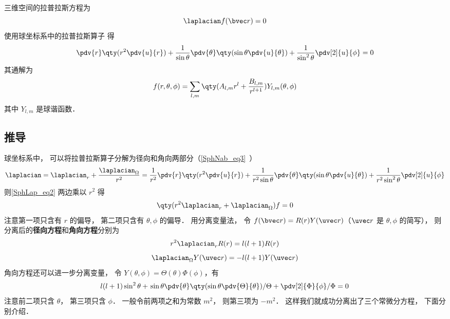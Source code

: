 

三维空间的拉普拉斯方程为
\begin{equation}\label{SphLap_eq2}
\laplacian f(\bvec r) = 0
\end{equation}
使用球坐标系中的拉普拉斯算子 得
\begin{equation}
\pdv{r} \qty(r^2 \pdv{u}{r}) + \frac{1}{\sin\theta}\pdv{\theta} \qty(\sin \theta \pdv{u}{\theta}) + \frac{1}{\sin^2 \theta} \pdv[2]{u}{\phi} = 0
\end{equation}
其通解为
\begin{equation}\label{SphLap_eq7}
f(r, \theta, \phi) = \sum_{l,m} \qty(A_{l,m} r^l + \frac{B_{l,m}}{r^{l+1}}) Y_{l,m} (\theta, \phi)
\end{equation}
其中 $Y_{l,m}$ 是球谐函数．

\subsection{推导}
球坐标系中， 可以将拉普拉斯算子分解为径向和角向两部分（\autoref{SphNab_eq3}~）
\begin{equation}\label{SphLap_eq5}
\laplacian = \laplacian_r + \frac{\laplacian_{\Omega}}{r^2} = \frac{1}{r^2} \pdv{r} \qty(r^2 \pdv{u}{r}) + \frac{1}{r^2\sin\theta}\pdv{\theta} \qty(\sin \theta \pdv{u}{\theta}) + \frac{1}{r^2\sin^2 \theta} \pdv[2]{u}{\phi}
\end{equation}
则\autoref{SphLap_eq2} 两边乘以 $r^2$ 得
\begin{equation}
\qty(r^2\laplacian_r + \laplacian_\Omega) f = 0
\end{equation}
注意第一项只含有 $r$ 的偏导， 第二项只含有 $\theta,\phi$ 的偏导． 用分离变量法， 令 $f(\bvec r) = R(r) Y(\uvec r)$（$\uvec r$ 是 $\theta, \phi$ 的简写）， 则分离后的\textbf{径向方程}和\textbf{角向方程}分别为
\begin{equation}\label{SphLap_eq4}
r^2\laplacian_r R(r) = l(l+1)R(r)
\end{equation}
\begin{equation}\label{SphLap_eq1}
\laplacian_{\Omega} Y(\uvec r) = -l(l+1) Y(\uvec r)
\end{equation}
角向方程还可以进一步分离变量， 令 $Y(\theta,\phi) = \Theta(\theta)\Phi(\phi)$，有
\begin{equation}\label{SphLap_eq3}
l(l+1)\sin^2 \theta + \left. \sin\theta\pdv{\theta} \qty(\sin \theta \pdv{\Theta}{\theta}) \middle/ \Theta + \pdv[2]{\Phi}{\phi} \middle/ \Phi = 0 \right.
\end{equation}
注意前二项只含 $\theta$， 第三项只含 $\phi$． 一般令前两项之和为常数 $m^2$， 则第三项为 $-m^2$． 这样我们就成功分离出了三个常微分方程， 下面分别介绍．

